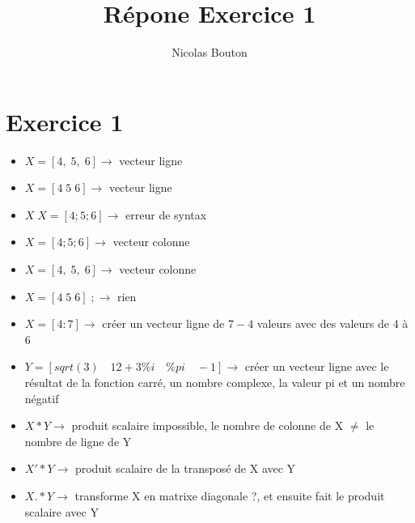 \documentclass[12pt, letterpaper]{article}
\title{Répone Exercice 1}
\author{Nicolas Bouton}
\begin{document}
\begin{titlepage}
\maketitle
\end{titlepage}

\section{Exercice 1}

\begin{itemize}
\item $X = [4,\; 5, \; 6] \rightarrow$ vecteur ligne
\item $X = [4 \; 5 \; 6] \rightarrow$ vecteur ligne
\item $X\;X = [4;5;6] \rightarrow$ erreur de syntax
\item $X = [4;5;6] \rightarrow$ vecteur colonne
\item $X = [4, \; 5, \; 6] \rightarrow$ vecteur colonne
\item $X = [4 \; 5 \; 6] \; ; \rightarrow$ rien
\item $X = [4:7] \rightarrow$ créer un vecteur ligne de $7-4$ valeurs avec des valeurs de 4 à 6
\item $Y = [sqrt(3) \quad 12+3\%i \quad \%pi \quad -1] \rightarrow$ créer un vecteur ligne avec le résultat de la fonction carré, un nombre complexe, la valeur pi et un nombre négatif
\item $X*Y \rightarrow$ produit scalaire impossible, le nombre de colonne de X $\neq$ le nombre de ligne de Y
\item $X'*Y \rightarrow$ produit scalaire de la transposé de X avec Y
  \item $X.*Y \rightarrow$ transforme X en matrixe diagonale ?, et ensuite fait le produit scalaire avec Y
\end{itemize}
\end{document}
